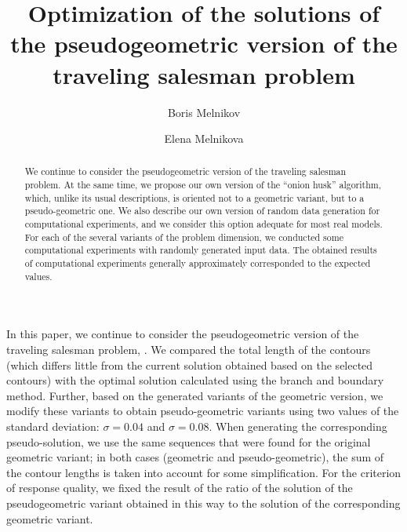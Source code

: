\documentclass[12pt]{llncs}
\begin{document}
\fi

\title{Optimization of the solutions of the pseudogeometric version of the traveling salesman problem}
%
%
\author{%
Boris Melnikov
\and
Elena Melnikova
}
%
%
%

\maketitle              %

\begin{abstract}
We continue to consider the pseudogeometric version of the traveling salesman problem. 
At the same time, we propose our own version of the ``onion husk'' algorithm, which, unlike its usual descriptions, is oriented not to a geometric variant, but to a pseudo-geometric one.
We also describe our own version of random data generation for computational experiments, and we consider this option adequate for most real models.
For each of the several variants of the problem dimension, we conducted some computational experiments with randomly generated input data. 
The obtained results of computational experiments generally approximately corresponded to the expected values.
\end{abstract}

In this paper, 
we continue to consider the pseudogeometric version 
of the traveling salesman problem, 
\cite{gu-pu,KIO-2021,KIO-2022,Vasil-2022-1,Vasil-2022-2,SOI-2013}.
We compared the total length of the contours (which differs little from the current solution obtained based on the selected contours) with the optimal solution calculated using the branch and boundary method.
Further, based on the generated variants of the geometric version, we modify these variants to obtain pseudo-geometric variants using two values
of the standard deviation: $\sigma=0.04$ and $\sigma=0.08$.
When generating the corresponding pseudo-solution, we use the same sequences that were found for the original geometric variant;
in both cases (geometric and pseudo-geometric), the sum of the contour lengths is taken into account for some simplification.
For the criterion of response quality, we fixed the result of the ratio of the solution of the pseudogeometric variant obtained in this way to the solution of the corresponding geometric variant.
\end{document}

